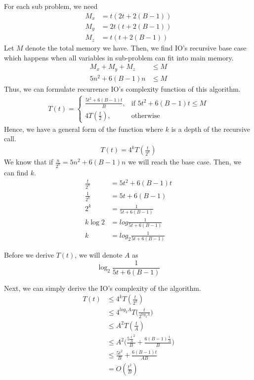 For each sub problem, we need
\begin{align*}
	M_x &= t(2t + 2(B-1)) \\
	M_y &= 2t(t+2(B-1))\\
	M_z &= t(t+2(B-1))
\end{align*}
Let $M$ denote the total memory we have. Then, we find IO's recursive base case which happens when all variables in sub-problem can fit into main memory.
\begin{align*}
M_x + M_y + M_z &\leq M \\
5n^2 + 6(B-1)n &\leq M
\end{align*}
Thus, we can formulate recurrence IO's complexity function of this algorithm.
\begin{align*}
	T(t) = \begin{cases}
	    \frac{5t^2 + 6(B-1)t}{B},& \text{if } 5t^2 + 6(B-1)t \leq M\\
	    4T(\frac{t}{2}),              & \text{otherwise}
	\end{cases}
\end{align*}
Hence, we have a general form of the function where $k$ is a depth of the recursive call.
\begin{align*}
	T(t) = 4^{k}T(\frac{t}{2^{k}})
\end{align*}
We know that if $\frac{n}{2^{k}} = 5n^2 + 6(B-1)n$ we will reach the base case. Then, we can find $k$.
\begin{align*}
	\frac{t}{2^k} &= 5t^2 + 6(B-1)t \\
	\frac{1}{2^k	} &= 5t + 6(B-1) \\
	2^k &= \frac{1}{5t + 6(B-1)} \\
	k\log2 &= log\frac{1}{5t + 6(B-1)} \\
	k &= log_2 \frac{1}{5t + 6(B-1)}
\end{align*}

Before we derive $T(t)$, we will denote $A$ as
$$\log_2 \frac{1}{5t + 6(B-1)}$$

Next, we can simply derive the IO's complexity of the algorithm.
\begin{align*}
	T(t) &\leq 4^{k}T(\frac{t}{2^{k}}) \\
	&\leq 4^{log_2 A}T\Big(\frac{t}{2^{log_2 A}}\Big) \\
	&\leq A^2T(\frac{t}{A}) \\
	&\leq A^2\Big( \frac{5\frac{t}{A}^2}{B} + \frac{6(B-1)\frac{t}{A}}{B} \Big) \\
	&\leq \frac{5t^2}{B} + \frac{6(B-1)t}{AB} \\
	&= O(\frac{t^2}{B})
\end{align*}

